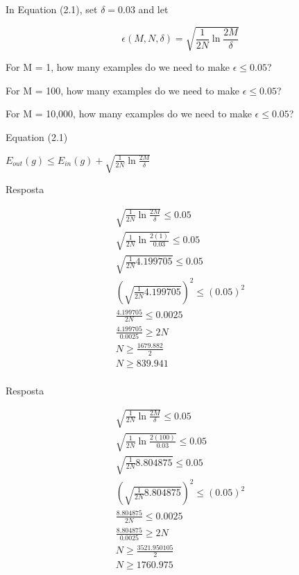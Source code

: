 \begin{enunciado}{1}
    In Equation (2.1), set $\delta = 0.03$ and let
    
    $$ \epsilon(M, N, \delta) = \sqrt{\frac{1}{2N} \ln{\frac{2M}{\delta}}}$$
    
     For M = 1, how many examples do we need to make $\epsilon \le 0.05$?
    
     For M = 100, how many examples do we need to make $\epsilon \le 0.05$?
    
     For M = 10,000, how many examples do we need to make $\epsilon \le 0.05$?
    
    \begin{grayt}
    Equation (2.1) %
    
    $ E_{out}(g) \leq E_{in}(g) + \sqrt{\frac{1}{2N} \ln{\frac{2M}{\delta}}} $
    \end{grayt}
    
\end{enunciado}

 Resposta

\begin{align*}
	\sqrt{\frac{1}{2N} \ln{\frac{2M}{\delta}}} \le 0.05 \\
	\sqrt{\frac{1}{2N} \ln{\frac{2(1)}{0.03}}} \le 0.05 \\
	\sqrt{\frac{1}{2N} {4.199705}} \le 0.05 \\
	\left( \sqrt{\frac{1}{2N} {4.199705}} \right) ^ {2} \le (0.05)^{2} \\
	\frac{4.199705}{2N} \le 0.0025 \\
	\frac{4.199705}{0.0025} \ge 2N \\
	N \ge \frac{1679.882}{2} \\
	N \ge {839.941} \\
\end{align*}


 Resposta

\begin{align*}
	\sqrt{\frac{1}{2N} \ln{\frac{2M}{\delta}}} \le 0.05 \\
	\sqrt{\frac{1}{2N} \ln{\frac{2(100)}{0.03}}} \le 0.05 \\
	\sqrt{\frac{1}{2N} {8.804875}} \le 0.05 \\
	\left( \sqrt{\frac{1}{2N} {8.804875}} \right) ^ {2} \le (0.05)^{2} \\
	\frac{8.804875}{2N} \le 0.0025 \\
	\frac{8.804875}{0.0025} \ge 2N \\
	N \ge \frac{3521.950105}{2} \\
	N \ge {1760.975} \\
\end{align*}


